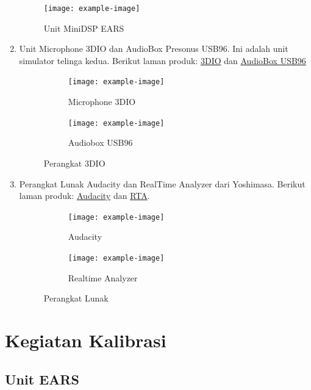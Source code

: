 \documentclass{article}
\begin{document}
\begin{enumerate}
		\begin{figure}[H]
			\centering
			\texttt{[image: example-image]}
			\caption{Unit MiniDSP EARS}
		\end{figure}

		\item Unit Microphone 3DIO dan AudioBox Presonus USB96. Ini adalah unit simulator telinga kedua.
		Berikut laman produk: \href{https://3diosound.com/products/free-space-pro-binaural-microphone}{3DIO}
		dan \href{https://www.frontendaudio.com/presonus-audiobox-usb-96-usb-audio-interface/}{AudioBox USB96}

		\begin{figure}[H]
			\centering
			\begin{subfigure}[]{.40\textwidth}
				\texttt{[image: example-image]}
				\caption{Microphone 3DIO}
			\end{subfigure}
			\begin{subfigure}[]{.40\textwidth}
				\texttt{[image: example-image]}
				\caption{Audiobox USB96}
			\end{subfigure}
			\caption{Perangkat 3DIO}
		\end{figure}

		\item Perangkat Lunak Audacity dan RealTime Analyzer dari Yoshimasa.
		Berikut laman produk: \href{https://www.audacityteam.org/}{Audacity} dan \href{http://www.ymec.com/products/dssf3e/}{RTA}.

		\begin{figure}[H]
			\centering
			\begin{subfigure}[]{.40\textwidth}
				\texttt{[image: example-image]}
				\caption{Audacity}
			\end{subfigure}
			\begin{subfigure}[]{.40\textwidth}
				\texttt{[image: example-image]}
				\caption{Realtime Analyzer}
			\end{subfigure}
			\caption{Perangkat Lunak}
		\end{figure}

	\end{enumerate}


	\newpage
	\section{Kegiatan Kalibrasi}

	\subsection{Unit EARS}
\end{document}
